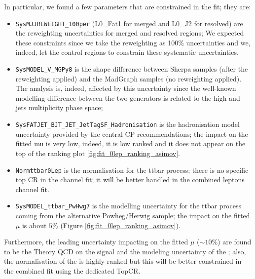 In particular, we found a few parameters that are constrained in the fit; they are:

\begin{itemize}
      \item \texttt{SysMJJREWEIGHT\_100per} (L0\_Fat1 for merged and L0\_J2 for resolved) 
            are the \mjjtag reweighting uncertainties for merged and resolved regions;
            We expected these constraints since we take the \mjjtag reweighting as 100\% uncertainties 
            and we, indeed, let the control regions to constrain these systematic uncertainties.

      \item \texttt{SysMODEL\_V\_MGPy8} is the shape difference between Sherpa samples 
      (after the \mjjtag reweighting applied) 
      and the MadGraph samples (no \mjjtag reweighting applied).
      The analysis is, indeed, affected by this uncertainty 
      since the well-known modelling difference between the two generators is related 
      to the high \mjjtag and jets multiplicity phase space; 

      \item \texttt{SysFATJET\_BJT\_JET\_JetTagSF\_Hadronisation} is the hadronisation model uncertainty 
      provided by the central CP recommendations; the impact on the fitted mu is very low, indeed, it is low ranked
      and it does not appear on the top of the ranking plot \ref{fig:fit_0lep_ranking_asimov}.

      \item \texttt{Normttbar0Lep} is the normalisation for the ttbar process; there is no specific top CR 
      in the \zlep channel fit; it will be better handled in the combined leptons channel fit.

      \item \texttt{SysMODEL\_ttbar\_PwHwg7} is the modelling uncertainty for the ttbar process 
      coming from the alternative Powheg/Herwig sample; the impact on the fitted $\mu$ 
      is about $5\%$ (Figure \ref{fig:fit_0lep_ranking_asimov}).

\end{itemize}

Furthermore, the leading uncertainty impacting on the fitted $\mu$ ($\sim 10\%$) 
are found to be the Theory QCD on the signal and the modeling uncertainty of the \Vjets;
also, the normalisation of the \ttbar is highly ranked but this will be better constrained
in the combined fit using the dedicated \olep TopCR.

\clearpage
